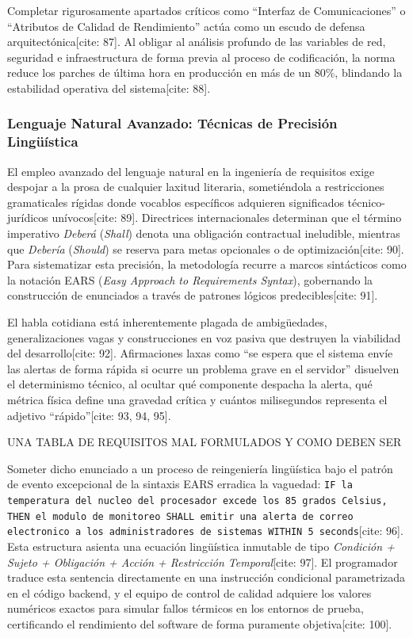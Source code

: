 \documentclass[11pt,a4paper]{article}
\begin{document}
	Completar rigurosamente apartados críticos como ``Interfaz de Comunicaciones'' o ``Atributos de Calidad de Rendimiento'' actúa como un escudo de defensa arquitectónica[cite: 87]. Al obligar al análisis profundo de las variables de red, seguridad e infraestructura de forma previa al proceso de codificación, la norma reduce los parches de última hora en producción en más de un 80\%, blindando la estabilidad operativa del sistema[cite: 88].
	
	\subsubsection{Lenguaje Natural Avanzado: Técnicas de Precisión Lingüística}
	El empleo avanzado del lenguaje natural en la ingeniería de requisitos exige despojar a la prosa de cualquier laxitud literaria, sometiéndola a restricciones gramaticales rígidas donde vocablos específicos adquieren significados técnico-jurídicos unívocos[cite: 89]. Directrices internacionales determinan que el término imperativo \textit{Deberá} (\textit{Shall}) denota una obligación contractual ineludible, mientras que \textit{Debería} (\textit{Should}) se reserva para metas opcionales o de optimización[cite: 90]. Para sistematizar esta precisión, la metodología recurre a marcos sintácticos como la notación EARS (\textit{Easy Approach to Requirements Syntax}), gobernando la construcción de enunciados a través de patrones lógicos predecibles[cite: 91].
	
	El habla cotidiana está inherentemente plagada de ambigüedades, generalizaciones vagas y construcciones en voz pasiva que destruyen la viabilidad del desarrollo[cite: 92]. Afirmaciones laxas como ``se espera que el sistema envíe las alertas de forma rápida si ocurre un problema grave en el servidor'' disuelven el determinismo técnico, al ocultar qué componente despacha la alerta, qué métrica física define una gravedad crítica y cuántos milisegundos representa el adjetivo ``rápido''[cite: 93, 94, 95].
	
	UNA TABLA DE REQUISITOS MAL FORMULADOS Y COMO DEBEN SER
	
	Someter dicho enunciado a un proceso de reingeniería lingüística bajo el patrón de evento excepcional de la sintaxis EARS erradica la vaguedad: \texttt{IF la temperatura del nucleo del procesador excede los 85 grados Celsius, THEN el modulo de monitoreo SHALL emitir una alerta de correo electronico a los administradores de sistemas WITHIN 5 seconds}[cite: 96]. Esta estructura asienta una ecuación lingüística inmutable de tipo \textit{Condición + Sujeto + Obligación + Acción + Restricción Temporal}[cite: 97]. El programador traduce esta sentencia directamente en una instrucción condicional parametrizada en el código backend, y el equipo de control de calidad adquiere los valores numéricos exactos para simular fallos térmicos en los entornos de prueba, certificando el rendimiento del software de forma puramente objetiva[cite: 100].
	
\end{document}

